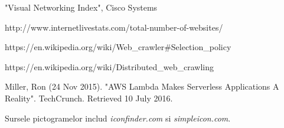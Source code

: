 \begin{thebibliography}{99}

"Visual Networking Index", Cisco Systems
  
http://www.internetlivestats.com/total-number-of-websites/
  
https://en.wikipedia.org/wiki/Web\_crawler\#Selection\_policy

https://en.wikipedia.org/wiki/Distributed\_web\_crawling

Miller, Ron (24 Nov 2015). "AWS Lambda Makes Serverless Applications A Reality". TechCrunch. Retrieved 10 July 2016.

Sursele pictogramelor includ \emph{iconfinder.com} si \emph{simpleicon.com}.

\end{thebibliography}
